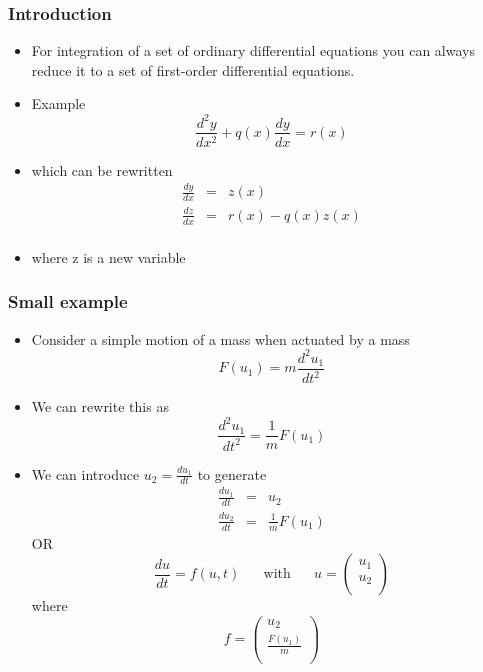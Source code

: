 \documentclass[10pt]{beamer}
\begin{document}
\begin{frame}
  \frametitle{Introduction}
  \begin{itemize}
  \item For integration of a set of ordinary differential equations
    you can always reduce it to a set of first-order differential
    equations. 
  \item Example
    \[
      \frac{d^2 y}{d x^2} + q(x) \frac{dy}{dx} = r(x)
    \]
  \item which can be rewritten
    \[
      \begin{array}{rcl}
        \frac{dy}{dx} & = & z(x)\\
        \frac{dz}{dx} & = & r(x)  - q(x) z(x) \\
      \end{array}
    \]
  \item where z is a new variable
  \end{itemize}
\end{frame}

\begin{frame}
  \frametitle{Small example}
  \begin{itemize}
  \item Consider a simple motion of a mass when actuated by a mass
    \[
      F(u_1) = m \frac{ d^2 u_1 }{ d t^2 }
    \]
  \item We can rewrite this as
    \[
      \frac{d^2 u_1}{d t^2} = \frac{1}{m} F(u_1)
    \]
  \item We can introduce $u_2 = \frac{du_1}{dt}$ to generate
    \[
      \begin{array}{rcl}
        \frac{du_1}{dt} & = & u_2\\
        \frac{du_2}{dt} & = & \frac{1}{m} F(u_1)
      \end{array}
    \] OR
    \[
      \frac{du}{dt} = f( u, t) \mbox{~~~~ with ~~~~} u = \left(
        \begin{array}{c}
          u_1 \\ u_2\\
        \end{array} \right)
    \]
    where
    \[
      f = \left(
        \begin{array}{c}
          u_2\\
          \frac{F(u_1)}{m}\\
        \end{array} \right)
    \]
  \end{itemize}
\end{frame}
\end{document}
